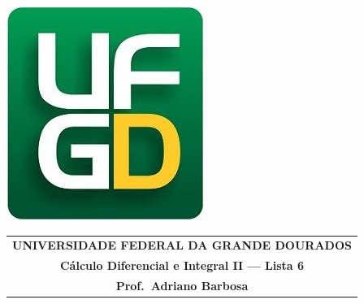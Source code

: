 \documentclass[a4paper,5pt]{amsbook}
\begin{document}
\thispagestyle{empty}
\pagestyle{empty}
\begin{minipage}[h]{0.14\textwidth}
	\includegraphics[scale=0.24]{../../ufgd.png}
\end{minipage}
\begin{minipage}[h]{\textwidth}
\begin{tabular}{c}
{{\bf UNIVERSIDADE FEDERAL DA GRANDE DOURADOS}}\\
{{\bf C\'{a}lculo Diferencial e Integral II --- Lista 6}}\\
{{\bf Prof.\ Adriano Barbosa}}\\
\end{tabular}
\vspace{-0.45cm}
%
\end{minipage}

\end{document}

